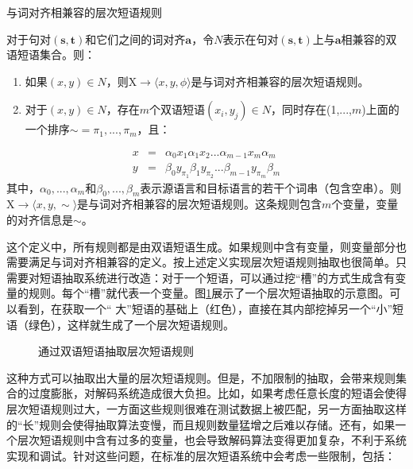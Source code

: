 \vspace{0.5em}
\begin{definition} 与词对齐相兼容的层次短语规则

{\small
对于句对$(\mathbf{s},\mathbf{t})$和它们之间的词对齐$\mathbf{a}$，令$N$表示在句对$(\mathbf{s},\mathbf{t})$上与$\mathbf{a}$相兼容的双语短语集合。则：
\begin{enumerate}
\item 	如果$(x,y)\in N$，则$\textrm{X} \to \langle x,y,\phi \rangle$是与词对齐相兼容的层次短语规则。
\item 	对于$(x,y)\in N$，存在$m$个双语短语$(x_i,y_j)\in N$，同时存在(1,$...$,$m$)上面的一个排序$\sim = {\pi_1 , ... ,\pi_m}$，且：
\end{enumerate}
\begin{eqnarray}
x&=&\alpha_0 x_1 \alpha_1 x_2 ... \alpha_{m-1} x_m \alpha_m \label{eqa4.23}\\
y&=&\beta_0 y_{\pi_1} \beta_1 y_{\pi_2} ... \beta_{m-1} y_{\pi_m} \beta_m
\label{eq:4-24}
\end{eqnarray}
其中，${\alpha_0, ... ,\alpha_m}$和${\beta_0, ... ,\beta_m}$表示源语言和目标语言的若干个词串（包含空串）。则$\textrm{X} \to \langle x,y,\sim \rangle$是与词对齐相兼容的层次短语规则。这条规则包含$m$个变量，变量的对齐信息是$\sim$。
}
\end{definition}

\parinterval 这个定义中，所有规则都是由双语短语生成。如果规则中含有变量，则变量部分也需要满足与词对齐相兼容的定义。按上述定义实现层次短语规则抽取也很简单。只需要对短语抽取系统进行改造：对于一个短语，可以通过挖``槽''的方式生成含有变量的规则。每个``槽''就代表一个变量。图\ref{fig:4-34}展示了一个层次短语抽取的示意图。可以看到，在获取一个`` 大''短语的基础上（红色），直接在其内部挖掉另一个``小''短语（绿色），这样就生成了一个层次短语规则。

\begin{figure}[htp]
\centering

\caption{通过双语短语抽取层次短语规则}
\label{fig:4-34}
\end{figure}

\parinterval 这种方式可以抽取出大量的层次短语规则。但是，不加限制的抽取，会带来规则集合的过度膨胀，对解码系统造成很大负担。比如，如果考虑任意长度的短语会使得层次短语规则过大，一方面这些规则很难在测试数据上被匹配，另一方面抽取这样的``长''规则会使得抽取算法变慢，而且规则数量猛增之后难以存储。还有，如果一个层次短语规则中含有过多的变量，也会导致解码算法变得更加复杂，不利于系统实现和调试。针对这些问题，在标准的层次短语系统中会考虑一些限制，包括：

